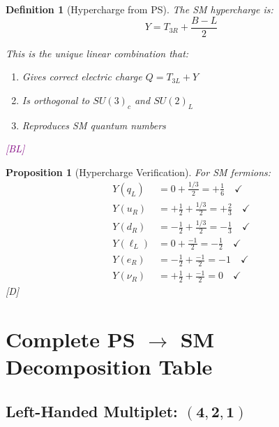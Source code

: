 \documentclass[11pt,a4paper]{article}
\newtheorem{proposition}[theorem]{Proposition}
\newtheorem{definition}[theorem]{Definition}
\newcommand{\tagD}{\textcolor{blue!70!black}{[D]}}
\newcommand{\tagBL}{\textcolor{purple}{[BL]}}
\begin{document}
\begin{definition}[Hypercharge from PS]
\label{def:hypercharge}
The SM hypercharge is:
\begin{equation}
\label{eq:hypercharge-def}
\boxed{Y = T_{3R} + \frac{B-L}{2}}
\end{equation}

This is the unique linear combination that:
\begin{enumerate}
    \item Gives correct electric charge $Q = T_{3L} + Y$
    \item Is orthogonal to $SU(3)_c$ and $SU(2)_L$
    \item Reproduces SM quantum numbers
\end{enumerate}
\tagBL
\end{definition}

\begin{proposition}[Hypercharge Verification]
\label{prop:hypercharge-verify}
For SM fermions:
\begin{align}
\label{eq:Y-qL}
Y(q_L) &= 0 + \frac{1/3}{2} = +\frac{1}{6} \quad \checkmark \\
\label{eq:Y-uR}
Y(u_R) &= +\frac{1}{2} + \frac{1/3}{2} = +\frac{2}{3} \quad \checkmark \\
\label{eq:Y-dR}
Y(d_R) &= -\frac{1}{2} + \frac{1/3}{2} = -\frac{1}{3} \quad \checkmark \\
\label{eq:Y-lL}
Y(\ell_L) &= 0 + \frac{-1}{2} = -\frac{1}{2} \quad \checkmark \\
\label{eq:Y-eR}
Y(e_R) &= -\frac{1}{2} + \frac{-1}{2} = -1 \quad \checkmark \\
\label{eq:Y-nuR}
Y(\nu_R) &= +\frac{1}{2} + \frac{-1}{2} = 0 \quad \checkmark
\end{align}
\tagD
\end{proposition}

\section{Complete PS $\to$ SM Decomposition Table}
\label{sec:decomp-table}

\subsection{Left-Handed Multiplet: $(\mathbf{4}, \mathbf{2}, \mathbf{1})$}
\end{document}
